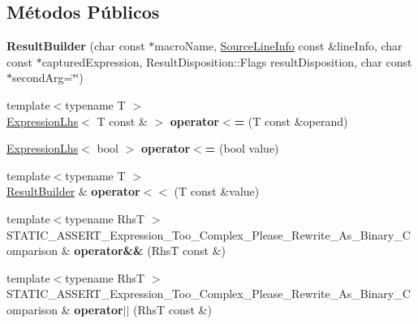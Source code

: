 \subsection*{Métodos Públicos}
\begin{DoxyCompactItemize}
\item 
{\bfseries Result\+Builder} (char const $\ast$macro\+Name, \hyperlink{structCatch_1_1SourceLineInfo}{Source\+Line\+Info} const \&line\+Info, char const $\ast$captured\+Expression, Result\+Disposition\+::\+Flags result\+Disposition, char const $\ast$second\+Arg=\char`\"{}\char`\"{})\hypertarget{classCatch_1_1ResultBuilder_a8579c3056f64f9324cf1181532828376}{}\label{classCatch_1_1ResultBuilder_a8579c3056f64f9324cf1181532828376}

\item 
{\footnotesize template$<$typename T $>$ }\\\hyperlink{classCatch_1_1ExpressionLhs}{Expression\+Lhs}$<$ T const \& $>$ {\bfseries operator$<$=} (T const \&operand)\hypertarget{classCatch_1_1ResultBuilder_a1829db87e701758c4c520988883b25b5}{}\label{classCatch_1_1ResultBuilder_a1829db87e701758c4c520988883b25b5}

\item 
\hyperlink{classCatch_1_1ExpressionLhs}{Expression\+Lhs}$<$ bool $>$ {\bfseries operator$<$=} (bool value)\hypertarget{classCatch_1_1ResultBuilder_a3b87b20bcd1ef9e630880e59eeefba2a}{}\label{classCatch_1_1ResultBuilder_a3b87b20bcd1ef9e630880e59eeefba2a}

\item 
{\footnotesize template$<$typename T $>$ }\\\hyperlink{classCatch_1_1ResultBuilder}{Result\+Builder} \& {\bfseries operator$<$$<$} (T const \&value)\hypertarget{classCatch_1_1ResultBuilder_a5aa79ce6160ab8cd800eb65bbd7a28a4}{}\label{classCatch_1_1ResultBuilder_a5aa79ce6160ab8cd800eb65bbd7a28a4}

\item 
{\footnotesize template$<$typename RhsT $>$ }\\S\+T\+A\+T\+I\+C\+\_\+\+A\+S\+S\+E\+R\+T\+\_\+\+Expression\+\_\+\+Too\+\_\+\+Complex\+\_\+\+Please\+\_\+\+Rewrite\+\_\+\+As\+\_\+\+Binary\+\_\+\+Comparison \& {\bfseries operator\&\&} (RhsT const \&)\hypertarget{classCatch_1_1ResultBuilder_a2bbd6b026765202aee224a14d24c68bc}{}\label{classCatch_1_1ResultBuilder_a2bbd6b026765202aee224a14d24c68bc}

\item 
{\footnotesize template$<$typename RhsT $>$ }\\S\+T\+A\+T\+I\+C\+\_\+\+A\+S\+S\+E\+R\+T\+\_\+\+Expression\+\_\+\+Too\+\_\+\+Complex\+\_\+\+Please\+\_\+\+Rewrite\+\_\+\+As\+\_\+\+Binary\+\_\+\+Comparison \& {\bfseries operator$\vert$$\vert$} (RhsT const \&)\hypertarget{classCatch_1_1ResultBuilder_ad489243e89e9f0ec3cb1f95392a537de}{}\label{classCatch_1_1ResultBuilder_ad489243e89e9f0ec3cb1f95392a537de}


\end{DoxyCompactItemize}

